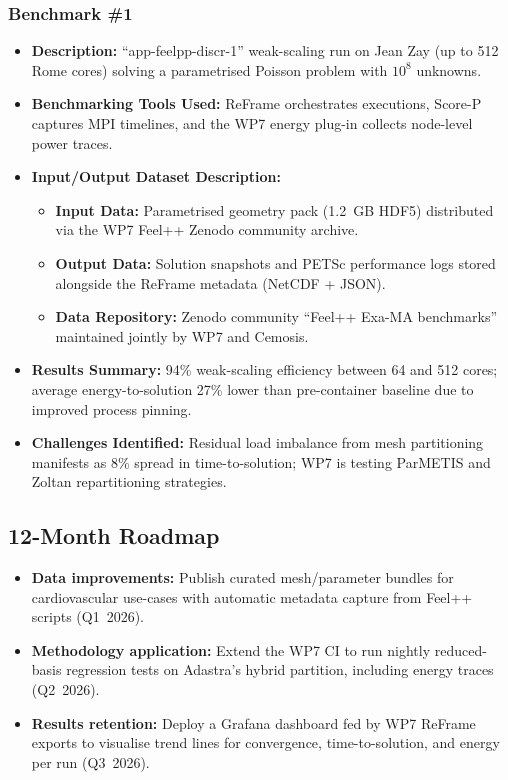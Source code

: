 \subsubsection{Benchmark \#1}
\begin{itemize}
    \item \textbf{Description:} ``app-feelpp-discr-1'' weak-scaling run on Jean Zay (up to 512 Rome cores) solving a parametrised Poisson problem with $10^8$ unknowns.
    \item \textbf{Benchmarking Tools Used:} ReFrame orchestrates executions, Score-P captures MPI timelines, and the WP7 energy plug-in collects node-level power traces.
    \item \textbf{Input/Output Dataset Description:}
        \begin{itemize}
            \item \textbf{Input Data:} Parametrised geometry pack (1.2~GB HDF5) distributed via the WP7 Feel++ Zenodo community archive.
            \item \textbf{Output Data:} Solution snapshots and PETSc performance logs stored alongside the ReFrame metadata (NetCDF + JSON).
            \item \textbf{Data Repository:} Zenodo community ``Feel++ Exa-MA benchmarks'' maintained jointly by WP7 and Cemosis.
        \end{itemize}
    \item \textbf{Results Summary:} 94\% weak-scaling efficiency between 64 and 512 cores; average energy-to-solution 27\% lower than pre-container baseline due to improved process pinning.
    \item \textbf{Challenges Identified:} Residual load imbalance from mesh partitioning manifests as 8\% spread in time-to-solution; WP7 is testing ParMETIS and Zoltan repartitioning strategies.
\end{itemize}

\subsection{12-Month Roadmap}
\label{sec:WP7:Feel++:roadmap}

\begin{itemize}
    \item \textbf{Data improvements:} Publish curated mesh/parameter bundles for cardiovascular use-cases with automatic metadata capture from Feel++ scripts (Q1~2026).
    \item \textbf{Methodology application:} Extend the WP7 CI to run nightly reduced-basis regression tests on Adastra's hybrid partition, including energy traces (Q2~2026).
    \item \textbf{Results retention:} Deploy a Grafana dashboard fed by WP7 ReFrame exports to visualise trend lines for convergence, time-to-solution, and energy per run (Q3~2026).
\end{itemize}